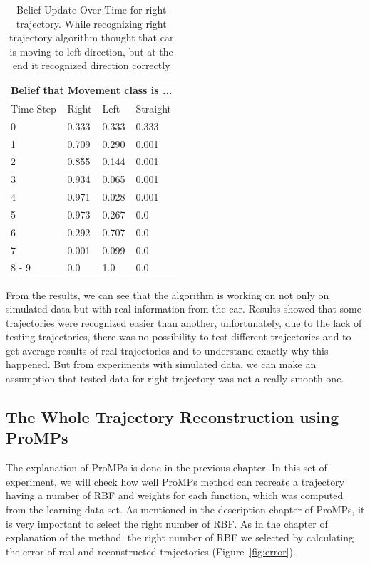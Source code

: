 \begin{table}[H]
	\centering
	\begin{tabular}{ |p{1.5cm}||p{1.5cm}|p{1.5cm}|p{1.5cm}|}
		\hline
		\multicolumn{4}{|c|}{Belief that Movement class is ...} \\
		\hline
		Time Step & Right & Left & Straight \\
		\hline
		0 & 0.333 & 0.333 & 0.333 \\
		1 & 0.709 & 0.290 & 0.001 \\
		2 & 0.855 & 0.144 & 0.001 \\
		3 & 0.934 & 0.065 & 0.001 \\
		4 & 0.971 & 0.028 & 0.001 \\
		5 & 0.973 & 0.267 & 0.0 \\
		6 & 0.292 & 0.707 & 0.0 \\
		7 & 0.001 & 0.099 & 0.0 \\
		8 - 9 & 0.0   & 1.0   & 0.0 \\
		\hline
	\end{tabular}
	\caption{Belief Update Over Time for right trajectory. While recognizing right trajectory algorithm thought that car is moving to left direction, but at the end it recognized direction correctly}
	\label{table:realright}
\end{table}

From the results, we can see that the algorithm is working on not only on simulated data but with real information from the car. Results showed that some trajectories were recognized easier than another, unfortunately, due to the lack of testing trajectories, there was no possibility to test different trajectories and to get average results of real trajectories and to understand exactly why this happened. But from experiments with simulated data, we can make an assumption that tested data for right trajectory was not a really smooth one.

\subsection{The Whole Trajectory Reconstruction using \gls{ProMPs}}

The explanation of \gls{ProMPs} is done in the previous chapter. In this set of experiment, we will check how well \gls{ProMPs} method can recreate a trajectory having a number of \gls{RBF} and weights for each function, which was computed from the learning data set. As mentioned in the description chapter of \gls{ProMPs}, it is very important to select the right number of \gls{RBF}. As in the chapter of explanation of the method, the right number of \gls{RBF} we selected by calculating the error of real and reconstructed trajectories (Figure~\ref{fig:error}).

